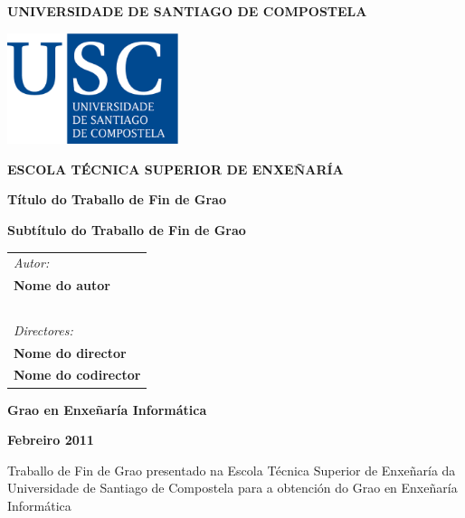 \pagestyle{empty}
\begin{center}
{\bf\Large UNIVERSIDADE DE SANTIAGO DE COMPOSTELA}

\vspace{0.5cm}
\includegraphics[width=5cm]{figuras/logo_usc.eps}

\vspace{0.5cm}
{\bf\large ESCOLA TÉCNICA SUPERIOR DE ENXEÑARÍA}

\vspace{2cm}
{\bf\LARGE Título do Traballo de Fin de Grao}

\vspace{0.5cm}
{\bf\LARGE Subtítulo do Traballo de Fin de Grao}
\end{center}

\vspace{2cm}
\hspace{4cm}\begin{tabular}{l}
{\it\Large Autor:} \\
{\bf\Large Nome do autor} \\
~ \\
{\it\Large Directores:} \\
{\bf\Large Nome do director} \\
{\bf\Large Nome do codirector} \\
\end{tabular}

\vspace{2cm}
\begin{center}
{\bf\Large Grao en Enxeñaría Informática}

\vspace{0.5cm}
{\bf\large Febreiro 2011}

\vspace{0.5cm}
Traballo de Fin de Grao presentado na Escola Técnica Superior de Enxeñaría da Universidade de Santiago de Compostela para a obtención do Grao en Enxeñaría Informática
\end{center}

